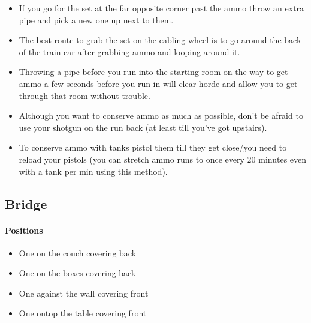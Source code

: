 \begin{itemize}
\item If you go for the set at the far opposite corner past the ammo throw an extra pipe and pick a new one up next to them. 
\item The best route to grab the set on the cabling wheel is to go around the back of the train car after grabbing ammo and looping around it. 
\item Throwing a pipe before you run into the starting room on the way to get ammo a few seconds before you run in will clear horde and allow you to get through that room without trouble.
\item Although you want to conserve ammo as much as possible, don't be afraid to use your shotgun on the run back (at least till you've got upstairs).
\item To conserve ammo with tanks pistol them till they get close/you need to reload your pistols (you can stretch ammo runs to once every 20 minutes even with a tank per min using this method).
\end{itemize}

\subsection{Bridge}
\paragraph{Positions}
\begin{itemize}
\item One on the couch covering back
\item One on the boxes covering back
\item One against the wall covering front
\item One ontop the table covering front
\end{itemize}

